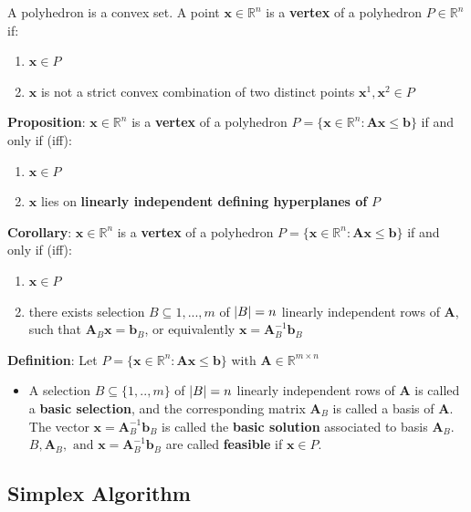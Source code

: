 \documentclass[11pt]{article}
\DeclarePairedDelimiter\abs{\lvert}{\rvert}
\begin{document}
\noindent
A polyhedron is a convex set. A point $\textbf{x}\in\mathbb{R}^n$ is a \textbf{vertex} of a polyhedron $P\in\mathbb{R}^n$ if:
\begin{enumerate}[label=\roman*)]
	\item $\textbf{x}\in P$
	\item $\textbf{x}$ is not a strict convex combination of two distinct points $\textbf{x}^1, \textbf{x}^2 \in P$
\end{enumerate}

\noindent
\textbf{Proposition}: $\textbf{x}\in\mathbb{R}^n$ is a \textbf{vertex} of a polyhedron $P=\{ \textbf{x}\in\mathbb{R}^n:\textbf{A}\textbf{x}\leq\textbf{b}\}$ if and only if (iff):
\begin{enumerate}[label=\roman*)]
	\item $\textbf{x}\in P$
	\item $\textbf{x}$ lies on \textbf{ linearly independent defining hyperplanes of} $P$
\end{enumerate}

\noindent
\textbf{Corollary}: $\textbf{x}\in\mathbb{R}^n$ is a \textbf{vertex} of a polyhedron $P=\{ \textbf{x}\in\mathbb{R}^n:\textbf{A}\textbf{x}\leq\textbf{b}\}$ if and only if (iff):
\begin{enumerate}[label=\roman*)]
	\item $\textbf{x}\in P$
	\item there exists selection $B \subseteq {1,...,m}$ of $\abs{B} = n$ linearly independent rows of $\textbf{A}$, such that $\textbf{A}_B\textbf{x} = \textbf{b}_B$, or equivalently $\textbf{x} = \textbf{A}_B^{-1} \textbf{b}_B$
\end{enumerate}

\noindent
\textbf{Definition}: Let $P=\{ \textbf{x}\in\mathbb{R}^n:\textbf{A}\textbf{x}\leq\textbf{b}\}$ with $\textbf{A}\in\mathbb{R}^{m\times n}$
\begin{itemize}[label=]
	\item A selection $B\subseteq\{ 1,..,m \}$ of $\abs{B} = n$ linearly independent rows of $\textbf{A}$ is called a \textbf{basic selection}, and the corresponding matrix $\textbf{A}_B$ is called a basis of $\textbf{A}$. The vector $\textbf{x} = \textbf{A}_B^{-1}\textbf{b}_B$ is called the \textbf{basic solution} associated to basis $\textbf{A}_B$. $B, \textbf{A}_B, \text{ and } \textbf{x} = \textbf{A}_B^{-1}\textbf{b}_B$ are called \textbf{feasible} if $\textbf{x}\in P$.
\end{itemize}

\subsection{Simplex Algorithm}
\end{document}
